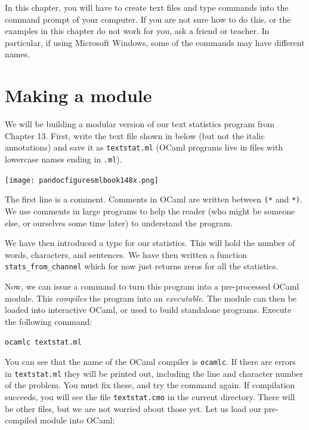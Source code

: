 \documentclass[]{book}
\newcommand{\smspace}{\vspace{4mm}}
\begin{document}
In this chapter, you will have to create text files and type commands into the command prompt of your computer. If you are not sure how to do this, or the examples in this chapter do not work for you, ask a friend or teacher. In particular, if using Microsoft Windows, some of the commands may have different names.

\section*{Making a module}

We will be building a modular version of our text statistics program from Chapter 13. First, write the text file shown in below (but not the italic annotations) and save it as \texttt{textstat.ml} (OCaml programs live in files with lowercase names ending in \texttt{.ml}).

\medskip
\begin{center}
\noindent\texttt{[image: pandocfiguresmlbook148x.png]}
\end{center}
\medskip

The first line is a comment. Comments in OCaml are written between \texttt{(*} and \texttt{*)}. We use comments in large programs to help the reader (who might be someone else, or ourselves some time later) to understand the program.

We have then introduced a type for our statistics. This will hold the number of words, characters, and sentences. We have then written a function \texttt{stats\_from\_channel} which for now just returns zeros for all the statistics.

Now, we can issue a command to turn this program into a pre-processed OCaml module. This \textit{compiles} the program into an \textit{executable}. The module can then be loaded into interactive OCaml, or used to build standalone programs. Execute the following command:

\smspace
\texttt{ocamlc textstat.ml}
\smspace

\noindent You can see that the name of the OCaml compiler is \texttt{ocamlc}. If there are errors in \texttt{textstat.ml} they will be printed out, including the line and character number of the problem. You must fix these, and try the command again. If compilation succeeds, you will see the file \texttt{textstat.cmo} in the current directory. There will be other files, but we are not worried about those yet. Let us load our pre-compiled module into OCaml:
\end{document}
